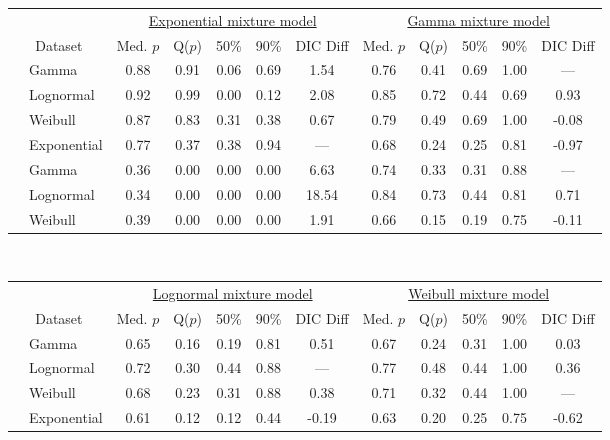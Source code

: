 \documentclass[useAMS,usenatbib,referee,12pt]{article}
\begin{document}
\begin{table}[ht]
\small\centering
\begin{tabular}{l|l|ccccc|ccccc}
 \multicolumn{2}{c}{ } & \multicolumn{5}{c}{\underline{Exponential mixture model}} & \multicolumn{5}{c}{\underline{Gamma mixture model}} \\
 \multicolumn{2}{c}{Dataset} & Med. $p$ & Q($p$) & 50\% & 90\% & DIC Diff & Med. $p$ & Q($p$) & 50\% & 90\% & DIC Diff \\ 
  \hline
\parbox[t]{2mm}{} & Gamma & 0.88 & 0.91 & 0.06 & 0.69 & 1.54 & 0.76 & 0.41 & 0.69 & 1.00 & --- \\ 
&   Lognormal & 0.92 & 0.99 & 0.00 & 0.12 & 2.08 & 0.85 & 0.72 & 0.44 & 0.69 & 0.93 \\ 
&   Weibull & 0.87 & 0.83 & 0.31 & 0.38 & 0.67 & 0.79 & 0.49 & 0.69 & 1.00 & -0.08 \\ 
&   Exponential & 0.77 & 0.37 & 0.38 & 0.94 & --- & 0.68 & 0.24 & 0.25 & 0.81 & -0.97 \\ 
\parbox[t]{2mm}{} & Gamma & 0.36 & 0.00 & 0.00 & 0.00 & 6.63 & 0.74 & 0.33 & 0.31 & 0.88 & --- \\ 
&   Lognormal & 0.34 & 0.00 & 0.00 & 0.00 & 18.54 & 0.84 & 0.73 & 0.44 & 0.81 & 0.71 \\ 
&   Weibull & 0.39 & 0.00 & 0.00 & 0.00 & 1.91 & 0.66 & 0.15 & 0.19 & 0.75 & -0.11 \\
   \hline
\end{tabular}
\vspace{0.5cm}\\
\begin{tabular}{l|l|ccccc|ccccc}
 \multicolumn{2}{c}{ } & \multicolumn{5}{c}{\underline{Lognormal mixture model}} & \multicolumn{5}{c}{\underline{Weibull mixture model}} \\
 \multicolumn{2}{c}{Dataset} & Med. $p$ & Q($p$) & 50\% & 90\% & DIC Diff & Med. $p$ & Q($p$) & 50\% & 90\% & DIC Diff \\ 
  \hline
\parbox[t]{2mm}{} & Gamma & 0.65 & 0.16 & 0.19 & 0.81 & 0.51 & 0.67 & 0.24 & 0.31 & 1.00 & 0.03 \\ 
&   Lognormal & 0.72 & 0.30 & 0.44 & 0.88 & --- & 0.77 & 0.48 & 0.44 & 1.00 & 0.36 \\ 
&   Weibull & 0.68 & 0.23 & 0.31 & 0.88 & 0.38 & 0.71 & 0.32 & 0.44 & 1.00 & --- \\ 
&   Exponential & 0.61 & 0.12 & 0.12 & 0.44 & -0.19 & 0.63 & 0.20 & 0.25 & 0.75 & -0.62 \\ 

\end{tabular}
\end{table}
\end{document}
